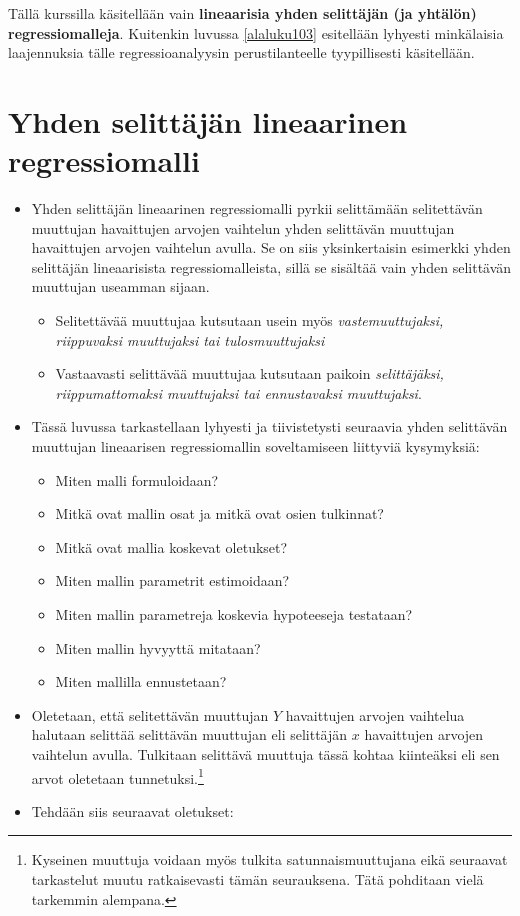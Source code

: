 \documentclass[
]{book}
\providecommand{\tightlist}{%
  \setlength{\itemsep}{0pt}\setlength{\parskip}{0pt}}
\begin{document}
Tällä kurssilla käsitellään vain \textbf{lineaarisia yhden selittäjän (ja yhtälön) regressiomalleja}. Kuitenkin luvussa \ref{alaluku103} esitellään lyhyesti minkälaisia laajennuksia tälle regressioanalyysin perustilanteelle tyypillisesti käsitellään.

\hypertarget{alaluku102}{%
\section{Yhden selittäjän lineaarinen regressiomalli}\label{alaluku102}}

\begin{itemize}
\item
  Yhden selittäjän lineaarinen regressiomalli pyrkii selittämään selitettävän muuttujan havaittujen arvojen vaihtelun yhden selittävän muuttujan havaittujen arvojen vaihtelun avulla. Se on siis yksinkertaisin esimerkki yhden selittäjän lineaarisista regressiomalleista, sillä se sisältää vain yhden selittävän muuttujan useamman sijaan.

  \begin{itemize}
  \tightlist
  \item
    Selitettävää muuttujaa kutsutaan usein myös \emph{vastemuuttujaksi, riippuvaksi muuttujaksi tai tulosmuuttujaksi}
  \item
    Vastaavasti selittävää muuttujaa kutsutaan paikoin \emph{selittäjäksi, riippumattomaksi muuttujaksi tai ennustavaksi muuttujaksi}.
  \end{itemize}
\item
  Tässä luvussa tarkastellaan lyhyesti ja tiivistetysti seuraavia yhden selittävän muuttujan lineaarisen regressiomallin soveltamiseen liittyviä kysymyksiä:

  \begin{itemize}
  \tightlist
  \item
    Miten malli formuloidaan?
  \item
    Mitkä ovat mallin osat ja mitkä ovat osien tulkinnat?
  \item
    Mitkä ovat mallia koskevat oletukset?
  \item
    Miten mallin parametrit estimoidaan?
  \item
    Miten mallin parametreja koskevia hypoteeseja testataan?
  \item
    Miten mallin hyvyyttä mitataan?
  \item
    Miten mallilla ennustetaan?
  \end{itemize}
\item
  Oletetaan, että selitettävän muuttujan \(Y\) havaittujen arvojen vaihtelua halutaan selittää selittävän muuttujan eli selittäjän \(x\) havaittujen arvojen vaihtelun avulla. Tulkitaan selittävä muuttuja tässä kohtaa kiinteäksi eli sen arvot oletetaan tunnetuksi.\footnote{Kyseinen muuttuja voidaan myös tulkita satunnaismuuttujana eikä seuraavat tarkastelut muutu ratkaisevasti tämän seurauksena. Tätä pohditaan vielä tarkemmin alempana.}
\item
  Tehdään siis seuraavat oletukset:


\end{itemize}
\end{document}
